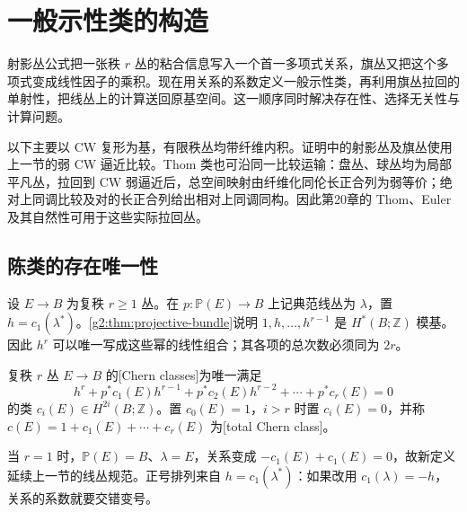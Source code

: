 
% 
% 

\section{一般示性类的构造}
\label{g2:sec:2103}

射影丛公式把一张秩 \(r\) 丛的粘合信息写入一个首一多项式关系，旗丛又把这个多项式变成线性因子的乘积。现在用关系的系数定义一般示性类，再利用旗丛拉回的单射性，把线丛上的计算送回原基空间。这一顺序同时解决存在性、选择无关性与计算问题。

以下主要以 CW 复形为基，有限秩丛均带纤维内积。证明中的射影丛及旗丛使用上一节的弱 CW 逼近比较。Thom 类也可沿同一比较运输：盘丛、球丛均为局部平凡丛，拉回到 CW 弱逼近后，总空间映射由纤维化同伦长正合列为弱等价；绝对上同调比较及对的长正合列给出相对上同调同构。因此第20章的 Thom、Euler 及其自然性可用于这些实际拉回丛。

\subsection{陈类的存在唯一性}
\label{g2:subsec:2103:01}
设 \(E\to B\) 为复秩 \(r\ge1\) 丛。在 \(p:\mathbb P(E)\to B\) 上记典范线丛为 \(\lambda\)，置 \(h=c_1(\lambda^*)\)。\cref{g2:thm:projective-bundle}说明 \(1,h,\ldots,h^{r-1}\) 是 \(H^*(B;\mathbb Z)\) 模基。因此 \(h^r\) 可以唯一写成这些幂的线性组合；其各项的总次数必须同为 \(2r\)。

\begin{definition}\label{g2:def:chern-classes-projective}
	复秩 \(r\) 丛 \(E\to B\) 的[Chern classes]为唯一满足
	\begin{equation}\label{g2:eq:chern-projective-relation}
		h^r+p^*c_1(E)h^{r-1}+p^*c_2(E)h^{r-2}+\cdots+p^*c_r(E)=0
	\end{equation}
	的类 \(c_i(E)\in H^{2i}(B;\mathbb Z)\)。置 \(c_0(E)=1\)，\(i>r\) 时置 \(c_i(E)=0\)，并称 \(c(E)=1+c_1(E)+\cdots+c_r(E)\) 为[total Chern class]。
\end{definition}

当 \(r=1\) 时，\(\mathbb P(E)=B\)、\(\lambda=E\)，关系变成 \(-c_1(E)+c_1(E)=0\)，故新定义延续上一节的线丛规范。正号排列来自 \(h=c_1(\lambda^*)\)：如果改用 \(c_1(\lambda)=-h\)，关系的系数就要交错变号。

